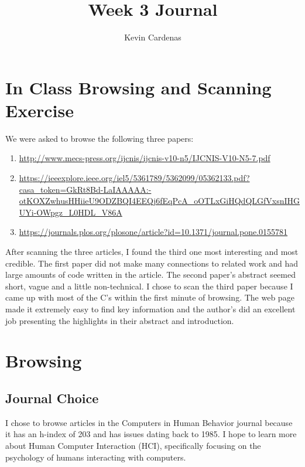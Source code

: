 \documentclass[a4paper]{article}
\title{Week 3 Journal}
\author{Kevin Cardenas}
\begin{document}
\maketitle

\section{In Class Browsing and Scanning Exercise}

We were asked to browse the following three papers:
\begin{enumerate}
    \item \url{http://www.mecs-press.org/ijcnis/ijcnis-v10-n5/IJCNIS-V10-N5-7.pdf}
    \item \url{https://ieeexplore.ieee.org/iel5/5361789/5362099/05362133.pdf?casa_token=GkRt8Bd-LaIAAAAA:-otKOXZwhusHHiieU9ODZBQI4EEQj6fEqPcA_oOTLxGiHQdQLGfVxsnIHGUYi-OWpgz_L0HDL_V86A}
    \item \url{https://journals.plos.org/plosone/article?id=10.1371/journal.pone.0155781}
\end{enumerate}

After scanning the three articles, I found the third one most interesting and most credible. The first paper did not make many connections to related work and had large amounts of code written in the article. The second paper's abstract seemed short, vague and a little non-technical. I chose to scan the third paper because I came up with most of the C's within the first minute of browsing. The web page made it extremely easy to find key information and the author's did an excellent job presenting the highlights in their abstract and introduction.  

\section{Browsing}

\subsection{Journal Choice}
I chose to browse articles in the Computers in Human Behavior journal because it has an h-index of 203 and has issues dating back to 1985. I hope to learn more about Human Computer Interaction (HCI), specifically focusing on the psychology of humans interacting with computers. 
\end{document}
